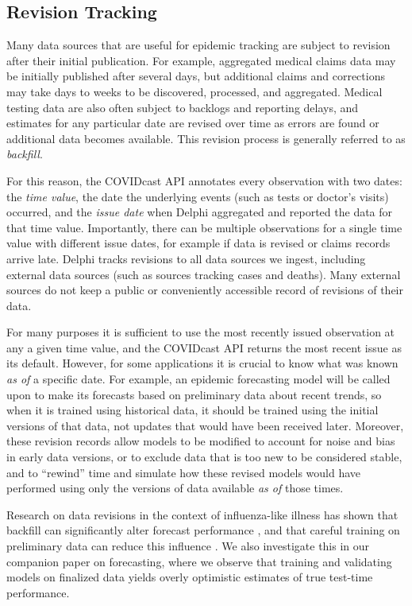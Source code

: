 \documentclass[9pt,twocolumn,twoside,lineno]{pnas-new}
\begin{document}
\subsection{Revision Tracking}
\label{subsec:revision_tracking}

Many data sources that are useful for epidemic tracking are subject to revision
after their initial publication. For example, aggregated medical claims data may
be initially published after several days, but additional claims and corrections
may take days to weeks to be discovered, processed, and aggregated. Medical
testing data are also often subject to backlogs and reporting delays, and
estimates for any particular date are revised over time as errors are found or
additional data becomes available. This revision process is generally referred
to as \textit{backfill}.

For this reason, the COVIDcast API annotates every observation with two dates:
the \textit{time value}, the date the underlying events (such as tests or
doctor's visits) occurred, and the \textit{issue date} when Delphi aggregated
and reported the data for that time value. Importantly, there can be multiple
observations for a single time value with different issue dates, for example if
data is revised or claims records arrive late. Delphi tracks revisions to all
data sources we ingest, including external data sources (such as sources
tracking cases and deaths). Many external sources do not keep a public or
conveniently accessible record of revisions of their data.

For many purposes it is sufficient to use the most recently issued observation
at any a given time value, and the COVIDcast API returns the most recent issue
as its default. However, for some applications it is crucial to know what was
known \textit{as of} a specific date. For example, an epidemic forecasting model
will be called upon to make its forecasts based on preliminary data about recent
trends, so when it is trained using historical data, it should be trained using
the initial versions of that data, not updates that would have been received
later. Moreover, these revision records allow models to be modified to account
for noise and bias in early data versions, or to exclude data that is too new to
be considered stable, and to ``rewind'' time and simulate how these revised
models would have performed using only the versions of data available \textit{as
of} those times.

Research on data revisions in the context of influenza-like illness has shown
that backfill can significantly alter forecast performance \cite{Brooks:2018,
  Reich:2019}, and that careful training on preliminary data can reduce this
influence \cite{Brooks:2020}. We also investigate this in our companion paper on
forecasting, where we observe that training and validating models on finalized 
data yields overly optimistic estimates of true test-time performance.    
\end{document}
